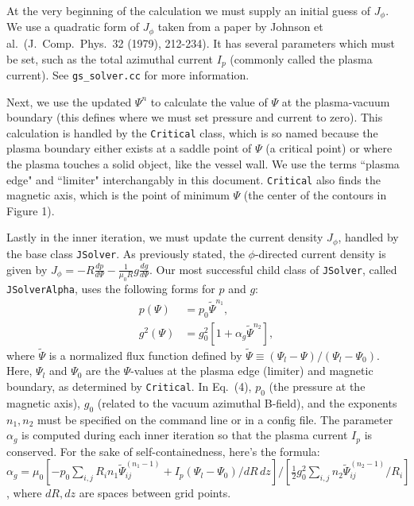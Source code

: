 \documentclass[paper=letter, fontsize=11pt]{scrartcl} %
\begin{document}
At the very beginning of the calculation we must supply an initial guess of $J_{\phi}$.  We use a quadratic form of $J_{\phi}$ taken from a paper by Johnson et al.~(J.~Comp.~Phys.~32 (1979), 212-234).  It has several parameters which must be set, such as the total azimuthal current $I_p$ (commonly called the plasma current).  See \texttt{gs\_solver.cc} for more information.

Next, we use the updated $\Psi^n$ to calculate the value of $\Psi$ at the plasma-vacuum boundary (this defines where we must set pressure and current to zero).  This calculation is handled by the \texttt{Critical} class, which is so named because the plasma boundary either exists at a saddle point of $\Psi$ (a critical point) or where the plasma touches a solid object, like the vessel wall. We use the terms ``plasma edge" and ``limiter" interchangably in this document.  \texttt{Critical} also finds the magnetic axis, which is the point of minimum $\Psi$ (the center of the contours in Figure 1).  

Lastly in the inner iteration, we must update the current density $J_{\phi}$, handled by the base class \texttt{JSolver}.  As previously stated, the $\phi$-directed current density is given by $J_{\phi} = -R \frac{d p}{d \Psi} - \frac{1}{\mu_0 R} g \frac{d g}{d \Psi}$. Our most successful child class of \texttt{JSolver}, called \texttt{JSolverAlpha}, uses the following forms for $p$ and $g$:
\begin{subequations}
\begin{align}
	p(\Psi) &= p_0 \widetilde{\Psi}^{n_1},\\
          g^2(\Psi) &= g_0^2  \left[1 + \alpha_g \widetilde{\Psi}^{n_2} \right],
\end{align}
\end{subequations}
where $\widetilde{\Psi}$ is a normalized flux function defined by $\widetilde{\Psi} \equiv (\Psi_l - \Psi)/(\Psi_l - \Psi_0)$.  Here,  $\Psi_l$ and $\Psi_0$ are the $\Psi$-values at the plasma edge (limiter) and magnetic boundary, as determined by \texttt{Critical}.  In Eq.~(4), $p_0$ (the pressure at the magnetic axis), $g_0$ (related to the vacuum azimuthal B-field), and the exponents $n_1,n_2$ must be specified on the command line or in a config file.  The parameter $\alpha_g$ is computed during each inner iteration so that the plasma current $I_p$ is conserved.   For the sake of self-containedness, here's the formula: $\alpha_g = \mu_0 \left[-p_0 \sum_{i,j} R_i n_1 \widetilde{\Psi}_{ij}^{(n_1-1)} + I_p (\Psi_l - \Psi_0)/dR\, dz \right] \bigg/ \left[\frac{1}{2} g_0^2 \sum_{i,j} n_2 \widetilde{\Psi}_{ij}^{(n_2-1)} / R_i\right]$, where $dR, dz$ are spaces between grid points.
\end{document}
